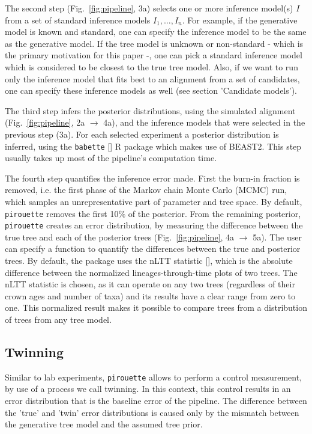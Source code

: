 The second step (Fig.~\ref{fig:pipeline}, 3a)
selects one or more inference model(s) $I$ from 
a set of standard inference models $I_{1},\dots,I_{n}$.
For example, if the generative model is known and standard,
one can specify the inference model to be the same as the generative model.
If the tree model is unknown or non-standard - which is the primary motivation for this paper -, one can pick
a standard inference model which is considered to be closest to the true tree model.
Also, if we want to run only the inference
model that fits best to an alignment from a set of candidates,
one can specify these inference models as 
well (see section 'Candidate models').

The third step infers the posterior distributions,
using the simulated alignment (Fig.~\ref{fig:pipeline}, 2a $\rightarrow$ 4a),
and the inference models that were selected in the previous step (3a). 
For each selected experiment a posterior distribution is inferred, using the 
\verb;babette; [\cite{bilderbeek2018babette}] R package which makes use of BEAST2. 
This step usually takes up most of the pipeline's computation time.

The fourth step quantifies the inference error made. 
First the burn-in fraction is removed, i.e. the first phase of the 
Markov chain Monte Carlo (MCMC) run,
which samples an unrepresentative part of parameter and tree space. 
By default, \verb;pirouette; 
removes the first 10\% of the posterior.
From the remaining posterior, \verb;pirouette; 
creates an error distribution, by measuring the difference
between the true tree and each of the posterior 
trees (Fig.~\ref{fig:pipeline}, 4a $\rightarrow$ 5a).
The user can specify a function to quantify the differences between
the true and posterior trees. By default, the package uses the nLTT 
statistic [\cite{janzen2015approximate}], which is the absolute difference
between the normalized lineages-through-time plots of two trees.
The nLTT statistic is chosen, as it can operate on any two trees (regardless
of their crown ages and number of taxa) and its results have a clear range
from zero to one. This normalized result makes it possible to compare trees 
from a distribution of trees from any tree model.

\subsection{Twinning}\label{subsec:twinning}

Similar to lab experiments, \verb;pirouette; allows to perform
a control measurement, by use of a process we call twinning. 
In this context, this control results in an error distribution
that is the baseline error of the pipeline. The difference
between the 'true' and 'twin' error distributions is caused only
by the mismatch between the generative tree model and the assumed
tree prior.


